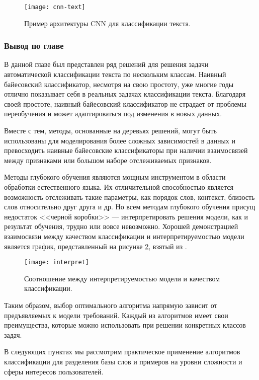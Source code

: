 \begin{figure}[h]
	\centering
	\texttt{[image: cnn-text]}
	\caption{Пример архитектуры CNN для классификации текста.}
	\label{fig:cnn-text}
\end{figure}

\subsubsection{Вывод по главе}
В данной главе был представлен ряд решений для решения задачи автоматической классификации текста по нескольким классам. Наивный байесовский классификатор, несмотря на свою простоту, уже многие годы отлично показывает себя в реальных задачах классификации текста. Благодаря своей простоте, наивный байесовский классификатор не страдает от проблемы переобучения и может адаптироваться под изменения в новых данных. 

Вместе с тем, методы, основанные на деревьях решений, могут быть использованы для моделирования более сложных зависимостей в данных и превосходить наивные байесовские классификаторы при наличии взаимосвязей между признаками или большом наборе отслеживаемых признаков.

Методы глубокого обучения являются мощным инструментом в области обработки естественного языка. Их отличительной способностью является возможность отслеживать такие параметры, как порядок слов, контекст, близость слов относительно друг друга и др. Но всем методам глубокого обучения присущ недостаток <<черной коробки>> --- интерпретировать решения модели, как и результат обучения, трудно или вовсе невозможно. Хорошей демонстрацией взаимосвязи между качеством классификации и интерпретируемостью модели является график, представленный на рисунке \ref{fig:interpret}, взятый из \cite{kowsari2019text}.

\begin{figure}[h]
	\centering
	\texttt{[image: interpret]}
	\caption{Соотношение между интерпретируемостью модели и качеством классификации.}
	\label{fig:interpret}
\end{figure}

Таким образом, выбор оптимального алгоритма напрямую зависит от предъявляемых к модели требований. Каждый из алгоритмов имеет свои преимущества, которые можно использовать при решении конкретных классов задач.

В следующих пунктах мы рассмотрим практическое применение алгоритмов классификации для разделения базы слов и примеров на уровни сложности и сферы интересов пользователей.
